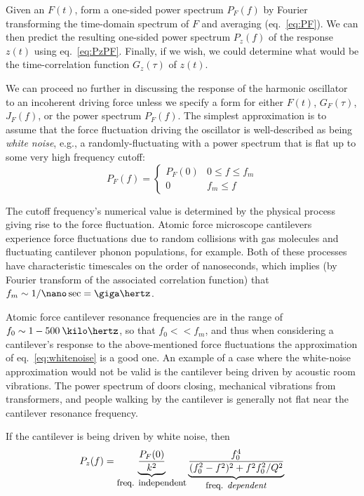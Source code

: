 Given an $F(t)$, form a one-sided power spectrum $P_F(f)$ by Fourier
transforming the time-domain spectrum of $F$ and averaging
(eq.~\ref{eq:PF}).  We can then predict the resulting one-sided power
spectrum $P_z(f)$ of the response $z(t)$ using eq.~\ref{eq:PzPF}.
Finally, if we wish, we could determine what would be the
time-correlation function $G_z(\tau)$ of $z(t)$.

We can proceed no further in discussing the response of the harmonic
oscillator to an incoherent driving force unless we specify a form for
either $F(t)$, $G_F(\tau)$, $J_F(f)$, or the power spectrum $P_F(f)$.
The simplest approximation is to assume that the force fluctuation
driving the oscillator is well-described as being \emph{white noise},
e.g., a randomly-fluctuating with a power spectrum that is flat up to
some very high frequency cutoff:
\begin{equation}
P_F(f) = \left\{ \begin{array}{cc} P_F(0) & 0 \leq f \leq f_m \\ 0 & f_m \leq f \end{array} \right.
\label{eq:whitenoise}
\end{equation}

The cutoff frequency's numerical value is determined by the physical
process giving rise to the force fluctuation.  Atomic force microscope
cantilevers experience force fluctuations due to random collisions
with gas molecules and fluctuating cantilever phonon populations, for
example.  Both of these processes have characteristic timescales on
the order of nanoseconds, which implies (by Fourier transform of the
associated correlation function) that $f_m \sim 1 / \nano\sec = \giga
\hertz$.  

Atomic force cantilever resonance frequencies are in the range of $f_0
\sim 1 - 500 \: \kilo \hertz$, so that $f_0 << f_m$, and thus when considering a cantilever's 
response to the above-mentioned force fluctuations the approximation
of eq.~\ref{eq:whitenoise} is a good one.  An example of a case where
the white-noise approximation would not be valid is the cantilever
being driven by acoustic room vibrations.  The power spectrum of doors
closing, mechanical vibrations from transformers, and people walking
by the cantilever is generally not flat near the cantilever resonance
frequency.

If the cantilever is being driven by white noise, then
\begin{equation}
P_z(f) = \underbrace{\frac{P_F(0)}{k^2}}_{\mbox{\small freq. independent}} 
\underbrace{\frac{f_0^4}{(f_0^2 - f^2)^2 + f^2 f_0^2 / Q^2}}_{\mbox{\small freq. \emph{dependent}}}
\label{eq:PzPFconst}
\end{equation}


